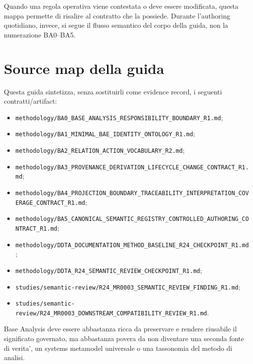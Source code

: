 \documentclass[11pt,a4paper]{article}
\newcommand{\artifact}[1]{\nolinkurl{#1}}
\begin{document}
\begin{reviewbox}
Quando una regola operativa viene contestata o deve essere modificata, questa mappa permette di risalire al contratto che la possiede. Durante l'authoring quotidiano, invece, si segue il flusso semantico del corpo della guida, non la numerazione BA0--BA5.
\end{reviewbox}

\section{Source map della guida}

Questa guida sintetizza, senza sostituirli come evidence record, i seguenti contratti/artifact:

\begin{itemize}
\item \artifact{methodology/BA0_BASE_ANALYSIS_RESPONSIBILITY_BOUNDARY_R1.md};
\item \artifact{methodology/BA1_MINIMAL_BAE_IDENTITY_ONTOLOGY_R1.md};
\item \artifact{methodology/BA2_RELATION_ACTION_VOCABULARY_R2.md};
\item \artifact{methodology/BA3_PROVENANCE_DERIVATION_LIFECYCLE_CHANGE_CONTRACT_R1.md};
\item \artifact{methodology/BA4_PROJECTION_BOUNDARY_TRACEABILITY_INTERPRETATION_COVERAGE_CONTRACT_R1.md};
\item \artifact{methodology/BA5_CANONICAL_SEMANTIC_REGISTRY_CONTROLLED_AUTHORING_CONTRACT_R1.md};
\item \artifact{methodology/DDTA_DOCUMENTATION_METHOD_BASELINE_R24_CHECKPOINT_R1.md};
\item \artifact{methodology/DDTA_R24_SEMANTIC_REVIEW_CHECKPOINT_R1.md};
\item \artifact{studies/semantic-review/R24_MR0003_SEMANTIC_REVIEW_FINDING_R1.md};
\item \artifact{studies/semantic-review/R24_MR0003_DOWNSTREAM_COMPATIBILITY_REVIEW_R1.md}.
\end{itemize}

\begin{statusclosed}
Base Analysis deve essere abbastanza ricca da preservare e rendere riusabile il significato governato, ma abbastanza povera da non diventare una seconda fonte di verita', un systems metamodel universale o una tassonomia del metodo di analisi.
\end{statusclosed}
\end{document}
